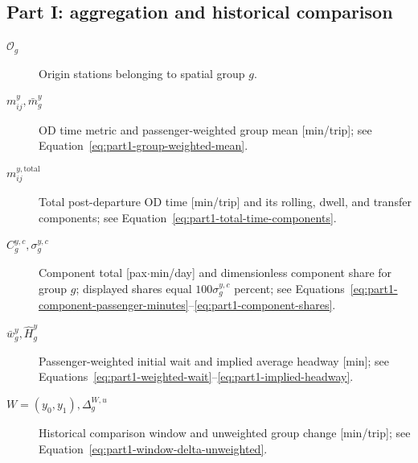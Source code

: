 \documentclass[preprint,12pt]{elsarticle}
\begin{document}
\subsection*{Part I: aggregation and historical comparison}
\begin{description}
    \item[$\mathcal{O}_g$] Origin stations belonging to spatial group \(g\).
    \item[$m^y_{ij},\bar m_g^y$] OD time metric and passenger-weighted group mean [min/trip]; see Equation~\eqref{eq:part1-group-weighted-mean}.
    \item[$m_{ij}^{y,\mathrm{total}}$] Total post-departure OD time [min/trip] and its rolling, dwell, and transfer components; see Equation~\eqref{eq:part1-total-time-components}.
    \item[$C_g^{y,c},\sigma_g^{y,c}$] Component total [pax\(\cdot\)min/day] and dimensionless component share for group \(g\); displayed shares equal \(100\sigma_g^{y,c}\) percent; see Equations~\eqref{eq:part1-component-passenger-minutes}--\eqref{eq:part1-component-shares}.
    \item[$\bar w_g^y,\widehat H_g^y$] Passenger-weighted initial wait and implied average headway [min]; see Equations~\eqref{eq:part1-weighted-wait}--\eqref{eq:part1-implied-headway}.
    \item[$W=(y_0,y_1),\Delta_g^{W,u}$] Historical comparison window and unweighted group change [min/trip]; see Equation~\eqref{eq:part1-window-delta-unweighted}.
\end{description}
\end{document}
